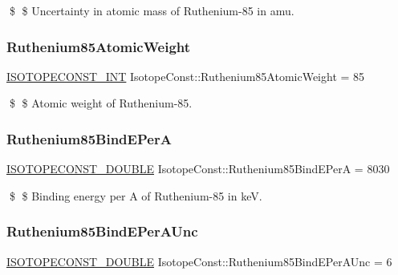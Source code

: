 \$ \$ Uncertainty in atomic mass of Ruthenium-\/85 in amu. \mbox{\label{group___isotope_const-_ruthenium-_ru85_gac9a06e3a60fe40492e904efa1384acaf}} 
\subsubsection{\texorpdfstring{Ruthenium85\+Atomic\+Weight}{Ruthenium85AtomicWeight}}
{\footnotesize\ttfamily \mbox{\hyperlink{group___isotope_const-_macros_ga5f18360b3e99483a35c32d789e62621c}{I\+S\+O\+T\+O\+P\+E\+C\+O\+N\+S\+T\+\_\+\+I\+NT}} Isotope\+Const\+::\+Ruthenium85\+Atomic\+Weight = 85}

\$ \$ Atomic weight of Ruthenium-\/85. \mbox{\label{group___isotope_const-_ruthenium-_ru85_gabb9b2692d3cafbede2d82810133e8628}} 
\subsubsection{\texorpdfstring{Ruthenium85\+Bind\+E\+PerA}{Ruthenium85BindEPerA}}
{\footnotesize\ttfamily \mbox{\hyperlink{group___isotope_const-_macros_ga8f45a7272ce02c0b4c65c44636ed719a}{I\+S\+O\+T\+O\+P\+E\+C\+O\+N\+S\+T\+\_\+\+D\+O\+U\+B\+LE}} Isotope\+Const\+::\+Ruthenium85\+Bind\+E\+PerA = 8030}

\$ \$ Binding energy per A of Ruthenium-\/85 in keV. \mbox{\label{group___isotope_const-_ruthenium-_ru85_gaad658c04994df4026e33ef462242d610}} 
\subsubsection{\texorpdfstring{Ruthenium85\+Bind\+E\+Per\+A\+Unc}{Ruthenium85BindEPerAUnc}}
{\footnotesize\ttfamily \mbox{\hyperlink{group___isotope_const-_macros_ga8f45a7272ce02c0b4c65c44636ed719a}{I\+S\+O\+T\+O\+P\+E\+C\+O\+N\+S\+T\+\_\+\+D\+O\+U\+B\+LE}} Isotope\+Const\+::\+Ruthenium85\+Bind\+E\+Per\+A\+Unc = 6}

